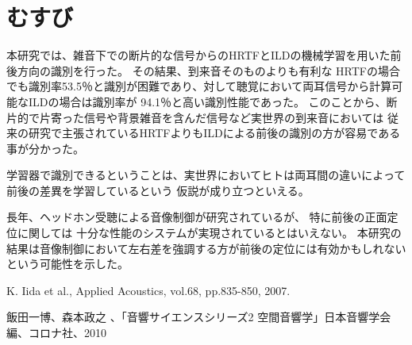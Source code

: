 \documentclass[autodetect-engine,12pt,titlepagedvi=dvipdfmx,ja=standard]{bxjsreport}
\begin{document}
\chapter{むすび}\label{chap4}

本研究では、雑音下での断片的な信号からのHRTFとILDの機械学習を用いた前後方向の識別を行った。
その結果、到来音そのものよりも有利な
HRTFの場合でも識別率53.5％と識別が困難であり、対して聴覚において両耳信号から計算可能なILDの場合は識別率が 94.1％と高い識別性能であった。
このことから、断片的で片寄った信号や背景雑音を含んだ信号など実世界の到来音においては
従来の研究で主張されているHRTFよりもILDによる前後の識別の方が容易である事が分かった。

学習器で識別できるということは、実世界においてヒトは両耳間の違いによって前後の差異を学習しているという
仮説が成り立つといえる。

長年、ヘッドホン受聴による音像制御が研究されているが、
特に前後の正面定位に関しては
十分な性能のシステムが実現されているとはいえない。
本研究の結果は音像制御において左右差を強調する方が前後の定位には有効かもしれないという可能性を示した。

\begin{thebibliography}{9}%
  K. Iida et al., Applied Acoustics, vol.68, pp.835-850, 2007.
  
  飯田一博、森本政之 、「音響サイエンスシリーズ2 空間音響学」日本音響学会編、コロナ社、2010
  \end{thebibliography}
\end{document}
